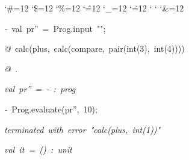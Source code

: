\begin{list}{}
{\setlength{\leftmargin}{\leftmargini}
\setlength{\rightmargin}{0cm}
\setlength{\itemindent}{0cm}
\setlength{\listparindent}{0cm}
\setlength{\itemsep}{0cm}
\setlength{\parsep}{0cm}
\setlength{\labelsep}{0cm}
\setlength{\labelwidth}{0cm}
\catcode`\#=12
\catcode`\$=12
\catcode`\%=12
\catcode`\^=12
\catcode`\_=12
\catcode`\.=12
\catcode`
\catcode`
\catcode`\&=12
\ttfamily}
\small
\item[]\textsl{-\ }val\ pr''\ =\ Prog.input\ "";
\item[]\textsl{@\ }calc(plus,\ calc(compare,\ pair(int(3),\ int(4))))
\item[]\textsl{@\ }.
\item[]\textsl{val\ pr''\ =\ -\ :\ prog}
\item[]\textsl{-\ }Prog.evaluate(pr'',\ 10);
\item[]\textsl{terminated\ with\ error\ "calc(plus,\ int(1))"}
\item[]\textsl{val\ it\ =\ ()\ :\ unit}
\end{list}
